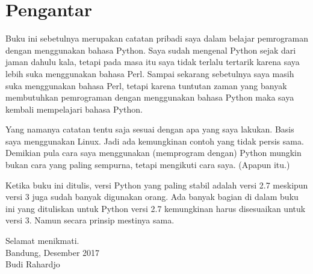 \chapter*{Pengantar}
Buku ini sebetulnya merupakan catatan pribadi saya dalam belajar pemrograman
dengan menggunakan bahasa Python. Saya sudah mengenal Python sejak dari jaman
dahulu kala, tetapi pada masa itu saya tidak terlalu tertarik karena saya lebih
suka menggunakan bahasa Perl. Sampai sekarang sebetulnya saya masih suka
menggunakan bahasa Perl, tetapi karena tuntutan zaman yang banyak membutuhkan
pemrograman dengan menggunakan bahasa Python maka saya kembali mempelajari
bahasa Python.

Yang namanya catatan tentu saja sesuai dengan apa yang saya lakukan. Basis saya
menggunakan Linux. Jadi ada kemungkinan contoh yang tidak persis sama. Demikian
pula cara saya menggunakan (memprogram dengan) Python mungkin bukan cara yang
paling sempurna, tetapi mengikuti cara saya. (Apapun itu.)

Ketika buku ini ditulis, versi Python yang paling stabil adalah versi 2.7
meskipun versi 3 juga sudah banyak digunakan orang. Ada banyak bagian di dalam
buku ini yang dituliskan untuk Python versi 2.7 kemungkinan harus disesuaikan
untuk versi 3. Namun secara prinsip mestinya sama.

Selamat menikmati.\\
Bandung, Desember 2017\\
Budi Rahardjo
